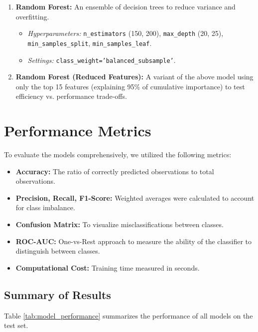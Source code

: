 \documentclass[11pt, a4paper]{article}
\begin{document}
\begin{enumerate}
    \item \textbf{Random Forest:} An ensemble of decision trees to reduce variance and overfitting.
    \begin{itemize}
        \item \textit{Hyperparameters:} \texttt{n\_estimators} (150, 200), \texttt{max\_depth} (20, 25), \texttt{min\_samples\_split}, \texttt{min\_samples\_leaf}.
        \item \textit{Settings:} \texttt{class\_weight='balanced\_subsample'}.
    \end{itemize}

    \item \textbf{Random Forest (Reduced Features):} A variant of the above model using only the top 15 features (explaining 95\% of cumulative importance) to test efficiency vs. performance trade-offs.
\end{enumerate}

\section{Performance Metrics}

To evaluate the models comprehensively, we utilized the following metrics:
\begin{itemize}
    \item \textbf{Accuracy:} The ratio of correctly predicted observations to total observations.
    \item \textbf{Precision, Recall, F1-Score:} Weighted averages were calculated to account for class imbalance.
    \item \textbf{Confusion Matrix:} To visualize misclassifications between classes.
    \item \textbf{ROC-AUC:} One-vs-Rest approach to measure the ability of the classifier to distinguish between classes.
    \item \textbf{Computational Cost:} Training time measured in seconds.
\end{itemize}

\subsection{Summary of Results}

Table \ref{tab:model_performance} summarizes the performance of all models on the test set.
\end{document}
